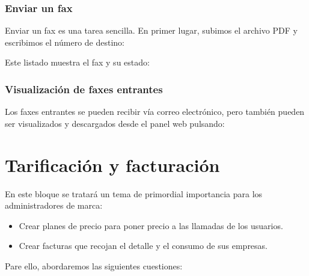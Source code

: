 \documentclass[letterpaper,10pt,spanish]{sphinxmanual}
\begin{document}
\subsection{Enviar un fax}
\label{faxing/index:sending-a-fax}
Enviar un fax es una tarea sencilla. En primer lugar, subimos el archivo PDF y escribimos el número de destino:


Este listado muestra el fax y su estado:



\subsection{Visualización de faxes entrantes}
\label{faxing/index:incoming-faxes-display}
Los faxes entrantes se pueden recibir vía correo electrónico, pero también pueden ser visualizados y descargados desde el panel web pulsando:

\noindent{}


\chapter{Tarificación y facturación}
\label{billing_and_invoices/index::doc}\label{billing_and_invoices/index:billing-and-invoices}
En este bloque se tratará un tema de primordial importancia para los administradores de marca:
\begin{itemize}
\item {} 
Crear planes de precio para poner precio a las llamadas de los usuarios.

\item {} 
Crear facturas que recojan el detalle y el consumo de sus empresas.

\end{itemize}

Pare ello, abordaremos las siguientes cuestiones:
\end{document}
